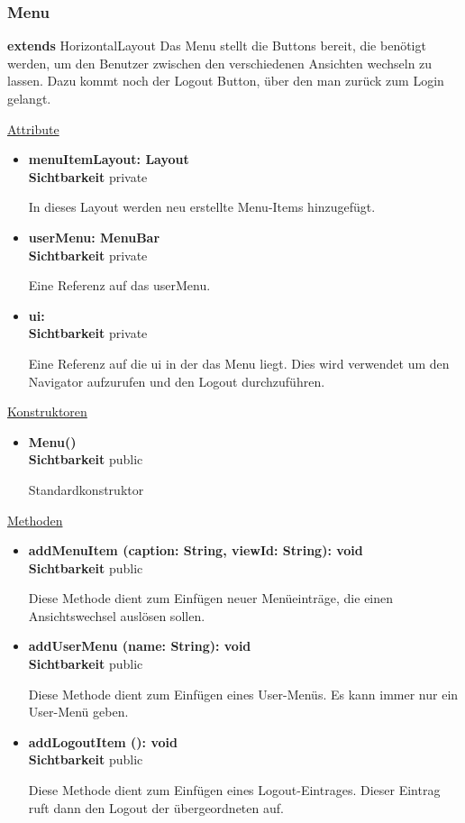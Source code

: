 \subsubsection{Menu}\label{Menu}
\textbf{extends}  HorizontalLayout \newline
Das Menu stellt die Buttons bereit, die benötigt werden, um den Benutzer zwischen den verschiedenen Ansichten wechseln zu lassen. Dazu kommt noch der Logout Button, über den man zurück zum Login gelangt.
\newline

\underline{Attribute}
\begin{itemize}
\itemsep0pt

\item \textbf{menuItemLayout: Layout} \hfill\\ 
\textbf{Sichtbarkeit} private

In dieses Layout werden neu erstellte Menu-Items hinzugefügt.

\item \textbf{userMenu: MenuBar} \hfill\\ 
\textbf{Sichtbarkeit} private

Eine Referenz auf das userMenu.

\item \textbf{ui: } \hfill\\ 
\textbf{Sichtbarkeit} private

Eine Referenz auf die ui in der das Menu liegt. Dies wird verwendet um den Navigator aufzurufen und den Logout durchzuführen.

\end{itemize}

\underline{Konstruktoren}
\begin{itemize}
\itemsep0pt
\item \textbf{Menu()} \hfill\\
\textbf{Sichtbarkeit} public

Standardkonstruktor
\end{itemize}

\underline{Methoden}
\begin{itemize}
\itemsep0pt
\item \textbf{addMenuItem (caption: String, viewId: String): void}\hfill\\
\textbf{Sichtbarkeit} public

Diese Methode dient zum Einfügen neuer Menüeinträge, die einen Ansichtswechsel auslösen sollen.

\item \textbf{addUserMenu (name: String): void}\hfill\\
\textbf{Sichtbarkeit} public

Diese Methode dient zum Einfügen eines User-Menüs. Es kann immer nur ein User-Menü geben.

\item \textbf{addLogoutItem (): void}\hfill\\
\textbf{Sichtbarkeit} public

Diese Methode dient zum Einfügen eines Logout-Eintrages. Dieser Eintrag ruft dann den Logout der übergeordneten  auf.

\end{itemize}
